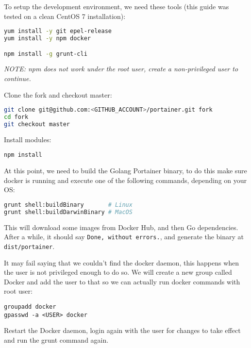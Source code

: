 To setup the development environment, we need these tools (this guide was tested on a clean CentOS 7 installation):

\begin{lstlisting}[language=bash]
yum install -y git epel-release
yum install -y npm docker

npm install -g grunt-cli
\end{lstlisting}

\begin{center}
\textit{NOTE: npm does not work under the root user, create a non-privileged user to continue.}
\end{center}

Clone the fork and checkout master:

\begin{lstlisting}[language=bash]
git clone git@github.com:<GITHUB_ACCOUNT>/portainer.git fork
cd fork
git checkout master
\end{lstlisting}

Install modules:

\begin{lstlisting}
npm install
\end{lstlisting}

At this point, we need to build the Golang Portainer binary, to do this make sure docker is running and execute one of the following commands, depending on your OS:

\begin{lstlisting}[language=bash]
grunt shell:buildBinary       # Linux
grunt shell:buildDarwinBinary # MacOS
\end{lstlisting}


This will download some images from Docker Hub, and then Go dependencies. After a while, it should say \texttt{Done, without errors.}, and generate the binary at \texttt{dist/portainer}.

\begin{story}
It may fail saying that we couldn't find the docker daemon, this happens when the user is not privileged enough to do so. We will create a new group called Docker and add the user to that so we can actually run docker commands with root user:

\begin{lstlisting}
groupadd docker
gpasswd -a <USER> docker
\end{lstlisting}

Restart the Docker daemon, login again with the user for changes to take effect and run the grunt command again.
\end{story}

